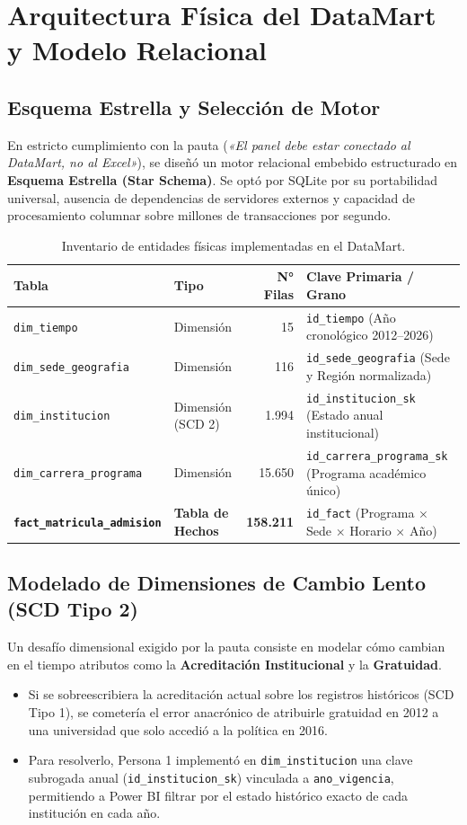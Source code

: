 \documentclass[11pt,a4paper]{article}
\begin{document}
\section{Arquitectura Física del DataMart y Modelo Relacional}

\subsection{Esquema Estrella y Selección de Motor}
En estricto cumplimiento con la pauta (\textit{«El panel debe estar conectado al DataMart, no al Excel»}), se diseñó un motor relacional embebido estructurado en \textbf{Esquema Estrella (Star Schema)}. Se optó por SQLite por su portabilidad universal, ausencia de dependencias de servidores externos y capacidad de procesamiento columnar sobre millones de transacciones por segundo.

\begin{table}[h!]
\centering
\small
\begin{tabular}{|l|l|r|l|}
\hline
\textbf{Tabla} & \textbf{Tipo} & \textbf{N° Filas} & \textbf{Clave Primaria / Grano} \\
\hline
\texttt{dim\_tiempo} & Dimensión & 15 & \texttt{id\_tiempo} (Año cronológico 2012--2026) \\
\texttt{dim\_sede\_geografia} & Dimensión & 116 & \texttt{id\_sede\_geografia} (Sede y Región normalizada) \\
\texttt{dim\_institucion} & Dimensión (SCD 2) & 1.994 & \texttt{id\_institucion\_sk} (Estado anual institucional) \\
\texttt{dim\_carrera\_programa} & Dimensión & 15.650 & \texttt{id\_carrera\_programa\_sk} (Programa académico único) \\
\hline
\textbf{\texttt{fact\_matricula\_admision}} & \textbf{Tabla de Hechos} & \textbf{158.211} & \texttt{id\_fact} (Programa $\times$ Sede $\times$ Horario $\times$ Año) \\
\hline
\end{tabular}
\caption{Inventario de entidades físicas implementadas en el DataMart.}
\end{table}

\subsection{Modelado de Dimensiones de Cambio Lento (SCD Tipo 2)}
Un desafío dimensional exigido por la pauta consiste en modelar cómo cambian en el tiempo atributos como la \textbf{Acreditación Institucional} y la \textbf{Gratuidad}. 
\begin{itemize}
    \item Si se sobreescribiera la acreditación actual sobre los registros históricos (SCD Tipo 1), se cometería el error anacrónico de atribuirle gratuidad en 2012 a una universidad que solo accedió a la política en 2016.
    \item Para resolverlo, Persona 1 implementó en \texttt{dim\_institucion} una clave subrogada anual (\texttt{id\_institucion\_sk}) vinculada a \texttt{ano\_vigencia}, permitiendo a Power BI filtrar por el estado histórico exacto de cada institución en cada año.
\end{itemize}
\end{document}
